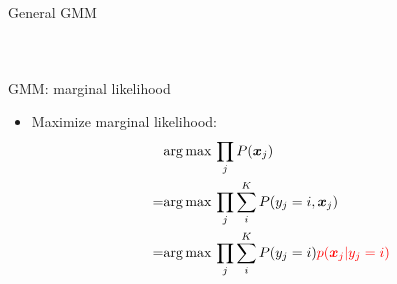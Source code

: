 \documentclass[12pt]{beamer}
\newcommand{\argmax}[1]{\underset{#1}{\operatorname*{arg\,max\,}}}
\begin{document}
\begin{frame}{General GMM}
\begin{columns}[c]
\column{6cm}
\begin{figure}
\end{figure}
\end{columns}
\end{frame}

\begin{frame}{GMM: marginal likelihood}
\begin{itemize}
	\item Maximize marginal likelihood:
	\begin{equation} \nonumber
	\begin{aligned}
	&\argmax{} \prod_{j} P(\bm{x}_j) \\
	=&\argmax{} \prod_{j}\sum_{i}^{K}P(y_j=i,\bm{x}_j) \\
	=&\argmax{} \prod_{j}\sum_{i}^{K}P(y_j=i)\textcolor{red}{p(\bm{x}_j|y_j=i)}
	\end{aligned}
	\end{equation}
\end{itemize}
\end{frame}
\end{document}
